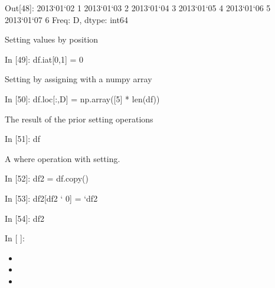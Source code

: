 \documentclass[letterpaper,10pt,english]{sphinxmanual}
\def\PYGZgt{\char`\>}
\def\PYGZhy{\char`\-}
\def\PYGZsq{\char`\'}
\renewcommand\PYGZsq{\textquotesingle}
\begin{document}
\begin{OriginalVerbatim}[commandchars=\\\{\}]
\textcolor{nbsphinxout}{Out[48]: }2013\PYGZhy{}01\PYGZhy{}02    1
         2013\PYGZhy{}01\PYGZhy{}03    2
         2013\PYGZhy{}01\PYGZhy{}04    3
         2013\PYGZhy{}01\PYGZhy{}05    4
         2013\PYGZhy{}01\PYGZhy{}06    5
         2013\PYGZhy{}01\PYGZhy{}07    6
         Freq: D, dtype: int64
\end{OriginalVerbatim}

Setting values by position

\begin{OriginalVerbatim}[commandchars=\\\{\}]
\textcolor{nbsphinxin}{In [49]: }df.iat[0,1] = 0
\end{OriginalVerbatim}

Setting by assigning with a numpy array

\begin{OriginalVerbatim}[commandchars=\\\{\}]
\textcolor{nbsphinxin}{In [50]: }df.loc[:,\PYGZsq{}D\PYGZsq{}] = np.array([5] * len(df))
\end{OriginalVerbatim}

The result of the prior setting operations

\begin{OriginalVerbatim}[commandchars=\\\{\}]
\textcolor{nbsphinxin}{In [51]: }df
\end{OriginalVerbatim}

A where operation with setting.

\begin{OriginalVerbatim}[commandchars=\\\{\}]
\textcolor{nbsphinxin}{In [52]: }df2 = df.copy()
\end{OriginalVerbatim}

\begin{OriginalVerbatim}[commandchars=\\\{\}]
\textcolor{nbsphinxin}{In [53]: }df2[df2 \PYGZgt{} 0] = \PYGZhy{}df2
\end{OriginalVerbatim}

\begin{OriginalVerbatim}[commandchars=\\\{\}]
\textcolor{nbsphinxin}{In [54]: }df2
\end{OriginalVerbatim}

\begin{OriginalVerbatim}[commandchars=\\\{\}]
\textcolor{nbsphinxin}{In [ ]: }
\end{OriginalVerbatim}
\begin{itemize}
\item {} 

\item {} 

\item {} 

\end{itemize}



\renewcommand{\indexname}{索引}
\printindex
\end{document}
